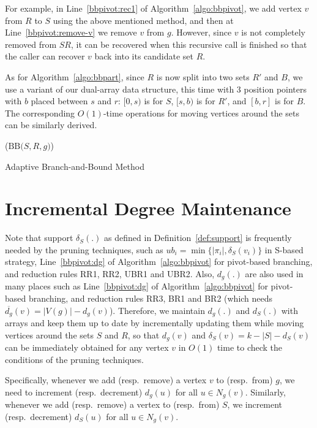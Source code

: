\documentclass[sigconf, nonacm]{acmart}
\begin{document}
For example, in Line~\ref{bbpivot:rec1} of Algorithm~\ref{algo:bbpivot}, we add vertex $v$ from $R$ to $S$ using the above mentioned method, and then at Line~\ref{bbpivot:remove-v} we remove $v$ from $g$. However, since $v$ is not completely removed from $SR$, it can be recovered when this recursive call is finished so that the caller can recover $v$ back into its candidate set $R$. 

As for Algorithm~\ref{algo:bbpart}, since $R$ is now split into two sets $R'$ and $B$, we use a variant of our dual-array data structure, this time with 3 position pointers with $b$ placed between $s$ and $r$: $[0, s)$ is for $S$, $[s, b)$ is for $R'$, and $[b, r]$ is for $B$. The corresponding $O(1)$-time operations for moving vertices around the sets can be similarly derived.

\begin{algorithm}[!t]
  \DontPrintSemicolon
  \Begin($\text{BB}{(}S, R, g{)}$){
  }
\caption{Adaptive Branch-and-Bound Method}    
\label{algo:adaptive}
\end{algorithm}

\section{Incremental Degree Maintenance}\label{appendix:deg_maintain} 
Note that support $\delta_S(.)$ as defined in Definition~\ref{def:support} is frequently needed by the pruning techniques, such as $ub_i=\min\{|\pi_i|, \delta_S(v_i)\}$ in S-based strategy, Line~\ref{bbpivot:dg} of Algorithm~\ref{algo:bbpivot} for pivot-based branching, and reduction rules RR1, RR2, UBR1 and UBR2. Also, $d_{g}(.)$ are also used in many places such as Line~\ref{bbpivot:dg} of Algorithm~\ref{algo:bbpivot} for pivot-based branching, and reduction rules RR3, BR1 and BR2 (which needs $\overline{d_g}(v)=|V(g)|-d_g(v)$). Therefore, we maintain $d_g(.)$ and $d_S(.)$ with arrays and keep them up to date by incrementally updating them while moving vertices around the sets $S$ and $R$, so that $d_{g}(v)$ and $\delta_S(v)=k-|S|-d_S(v)$ can be immediately obtained for any vertex $v$ in $O(1)$ time to check the conditions of the pruning techniques.

Specifically, whenever we add (resp.\ remove) a vertex $v$ to (resp.\ from) $g$, we need to increment (resp.\ decrement) $d_g(u)$ for all $u\in N_g(v)$. Similarly, whenever we add (resp.\ remove) a vertex to (resp.\ from) $S$, we increment (resp.\ decrement) $d_S(u)$ for all $u\in N_g(v)$.
\end{document}
